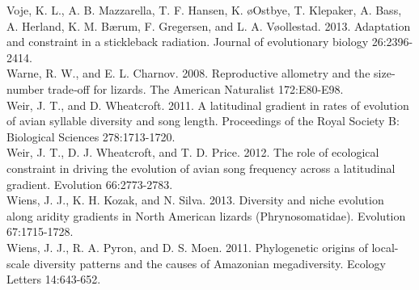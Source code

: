 \documentclass[a4paper,12pt]{article}
\begin{document}
Voje, K. L., A. B. Mazzarella, T. F. Hansen, K. \o{O}stbye, T. Klepaker, A. Bass, A. Herland, K. M. Bærum, F. Gregersen, and L. A. V\o{o}llestad. 2013. Adaptation and constraint in a stickleback radiation. Journal of evolutionary biology 26:2396-2414.\\
Warne, R. W., and E. L. Charnov. 2008. Reproductive allometry and the size‐number trade‐off for lizards. The American Naturalist 172:E80-E98.\\
Weir, J. T., and D. Wheatcroft. 2011. A latitudinal gradient in rates of evolution of avian syllable diversity and song length. Proceedings of the Royal Society B: Biological Sciences 278:1713-1720.\\
Weir, J. T., D. J. Wheatcroft, and T. D. Price. 2012. The role of ecological constraint in driving the evolution of avian song frequency across a latitudinal gradient. Evolution 66:2773-2783.\\
Wiens, J. J., K. H. Kozak, and N. Silva. 2013. Diversity and niche evolution along aridity gradients in North American lizards (Phrynosomatidae). Evolution 67:1715-1728.\\
Wiens, J. J., R. A. Pyron, and D. S. Moen. 2011. Phylogenetic origins of local-scale diversity patterns and the causes of Amazonian megadiversity. Ecology Letters 14:643-652.
\end{document}
